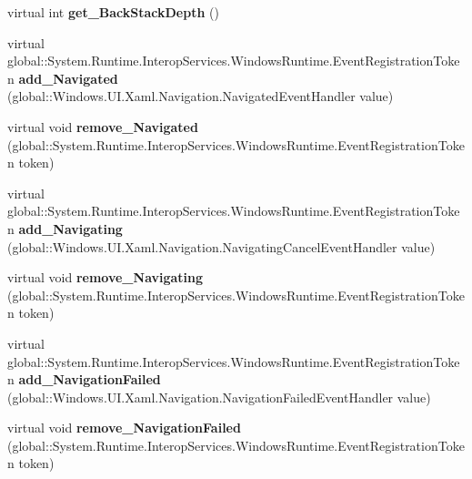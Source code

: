 \begin{DoxyCompactItemize}
virtual int {\bfseries get\+\_\+\+Back\+Stack\+Depth} ()
\item 
\mbox{\label{class_windows_1_1_u_i_1_1_xaml_1_1_controls_1_1_frame_a38b94e8bce03524a1c9b3c012074a6e8}} 
virtual global\+::\+System.\+Runtime.\+Interop\+Services.\+Windows\+Runtime.\+Event\+Registration\+Token {\bfseries add\+\_\+\+Navigated} (global\+::\+Windows.\+U\+I.\+Xaml.\+Navigation.\+Navigated\+Event\+Handler value)
\item 
\mbox{\label{class_windows_1_1_u_i_1_1_xaml_1_1_controls_1_1_frame_a6ba58ec5fb87b903e976124fe13e19c0}} 
virtual void {\bfseries remove\+\_\+\+Navigated} (global\+::\+System.\+Runtime.\+Interop\+Services.\+Windows\+Runtime.\+Event\+Registration\+Token token)
\item 
\mbox{\label{class_windows_1_1_u_i_1_1_xaml_1_1_controls_1_1_frame_afe49379e4ea3f7d217517f9ee7ba2bf9}} 
virtual global\+::\+System.\+Runtime.\+Interop\+Services.\+Windows\+Runtime.\+Event\+Registration\+Token {\bfseries add\+\_\+\+Navigating} (global\+::\+Windows.\+U\+I.\+Xaml.\+Navigation.\+Navigating\+Cancel\+Event\+Handler value)
\item 
\mbox{\label{class_windows_1_1_u_i_1_1_xaml_1_1_controls_1_1_frame_acc34f8b3bc84d17cad43aca5bcf5e0d4}} 
virtual void {\bfseries remove\+\_\+\+Navigating} (global\+::\+System.\+Runtime.\+Interop\+Services.\+Windows\+Runtime.\+Event\+Registration\+Token token)
\item 
\mbox{\label{class_windows_1_1_u_i_1_1_xaml_1_1_controls_1_1_frame_aa26741405bfc110f4b1b1905879092fd}} 
virtual global\+::\+System.\+Runtime.\+Interop\+Services.\+Windows\+Runtime.\+Event\+Registration\+Token {\bfseries add\+\_\+\+Navigation\+Failed} (global\+::\+Windows.\+U\+I.\+Xaml.\+Navigation.\+Navigation\+Failed\+Event\+Handler value)
\item 
\mbox{\label{class_windows_1_1_u_i_1_1_xaml_1_1_controls_1_1_frame_a5d519629c46865af9d6caf0f44a517fd}} 
virtual void {\bfseries remove\+\_\+\+Navigation\+Failed} (global\+::\+System.\+Runtime.\+Interop\+Services.\+Windows\+Runtime.\+Event\+Registration\+Token token)

\end{DoxyCompactItemize}
